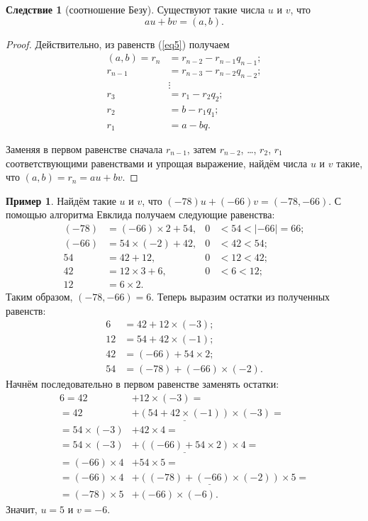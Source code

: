 \documentclass[14pt, a4paper]{extarticle}
\theoremstyle{definition}
\newtheorem{example}{Пример}
\newtheorem{corollary}{Следствие}[theorem]
\begin{document}
	\begin{corollary}[соотношение Безу]
	\label{bezu}
		Существуют такие числа $u$ и $v$, что $$\boxed{au+bv=(a,b).}$$
	\end{corollary}
	\begin{proof}
		Действительно, из равенств (\ref{eq5}) получаем
		\begin{align*}
			(a,b)=r_n&=r_{n-2}-r_{n-1}q_{n-1};\\
			r_{n-1}&=r_{n-3}-r_{n-2}q_{n-2};\\
			&\vdots\\
			r_3&=r_1-r_2q_2;\\
			r_2&=b-r_1q_1;\\
			r_1&=a-bq.
		\end{align*}
		
		Заменяя в первом равенстве сначала $r_{n-1}$, затем $r_{n-2}$, \dots, $r_2$, $r_1$ соответствующими равенствами и упрощая выражение, найдём числа $u$ и $v$ такие, что $(a,b)=r_n=au+bv$.
	\end{proof}

	\begin{example}
		Найдём такие $u$ и $v$, что $(-78)u+(-66)v=(-78,-66)$. С помощью алгоритма Евклида получаем следующие равенства:
		\begin{align*}
				(-78)&=(-66)\times2+54,&0&<54<|-66|=66;\\
				(-66)&=54\times(-2)+42,&0&<42<54;\\
				54&=42+12,&0&<12<42;\\
				42&=12\times3+6,&0&<6<12;\\
				12&=6\times2.
		\end{align*}
		Таким образом, $(-78,-66)=6$. Теперь выразим остатки из полученных равенств:
		\begin{align*}
			6&=42+12\times(-3);\\
			12&=54+42\times(-1);\\
			42&=(-66)+54\times2;\\
			54&=(-78)+(-66)\times(-2).
		\end{align*}
		Начнём последовательно в первом равенстве заменять остатки:
		\begin{align*}
			6=42&+\boxed{12}\times(-3)=\\
			=42&+\underline{(54+42\times(-1))}\times(-3)=\\
			=54\times(-3)&+\boxed{42}\times4=\\
			=54\times(-3)&+\underline{((-66)+54\times2)}\times4=\\
			=(-66)\times4&+\boxed{54}\times5=\\
			=(-66)\times4&+\underline{((-78)+(-66)\times(-2))}\times5=\\
			=\boxed{(-78)}\times5&+\boxed{(-66)}\times(-6).
		\end{align*}
		Значит, $u=5$ и $v=-6$.
	\end{example}
\end{document}
